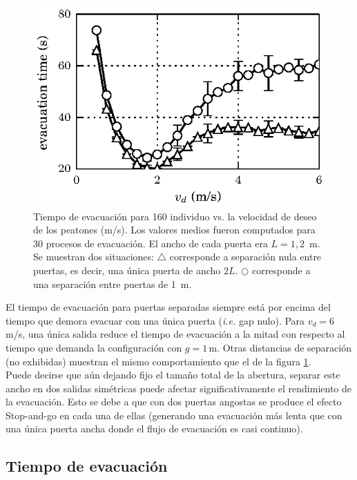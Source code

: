 \begin{figure}[H]
    \centering
    \includegraphics[scale=1.6]{figuras/fis.eps}
    \caption[width=5cm]{Tiempo de evacuación para 160 individuo vs. la velocidad de deseo de los peatones (m/s). Los valores medios fueron computados para 30 procesos de evacuación. El ancho de cada puerta era $L=1,2$~m. Se muestran dos situaciones:  $\bigtriangleup$ corresponde a separación nula entre puertas, es decir, una única puerta de ancho  $2L$. $\bigcirc$ corresponde a una separación entre puertas de 1~m.}
    \label{fiss}
\end{figure}

El tiempo de evacuación para puertas separadas siempre está por encima del tiempo que demora evacuar con una única puerta (\emph{i.e.} gap nulo). Para $v_d=6\,$m/s, una única salida reduce el tiempo de evacuación a la mitad con respecto al tiempo que demanda la configuración con $g=1\,$m. Otras distancias de separación (no exhibidas) muestran el mismo comportamiento que el de la figura \ref{fiss}.\\

Puede decirse que aún dejando fijo el tamaño total de la abertura, separar este ancho en dos salidas simétricas puede afectar significativamente el rendimiento de la evacuación. Esto se debe a que  con dos puertas angostas se produce el efecto Stop-and-go en cada una de ellas (generando una evacuación más lenta que con una única puerta ancha donde el flujo de evacuación es casi continuo). 

\subsection{Tiempo de evacuación}

